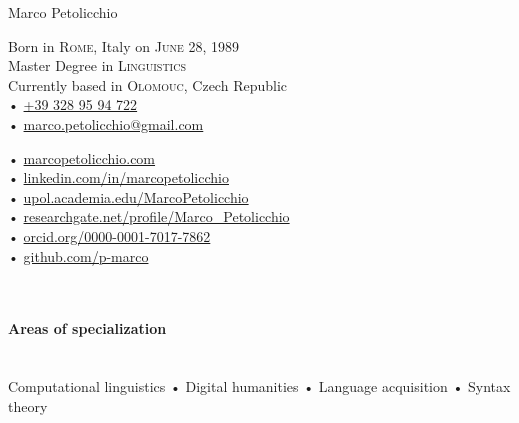 \documentclass[10pt, a4paper]{article}
\begin{document}
\reversemarginpar
{{\huge Marco Petolicchio}\\[1.2cm]
\parbox{.5\linewidth}{

Born in \textsc{Rome}, Italy on \textsc{June 28, 1989} \\
Master Degree in \textsc{Linguistics}\\
Currently based in \textsc{Olomouc}, Czech Republic \\[.4cm]
• \href{tel:+393289594722}{+39 328 95 94 722}\\
• \href{mailto:marco.petolicchio@gmail.com}{marco.petolicchio@gmail.com}
}
\parbox{.5\linewidth}{
• \href{http://marcopetolicchio.com}{marcopetolicchio.com}\\
• \href{http://www.linkedin.com/in/marcopetolicchio/}{linkedin.com/in/marcopetolicchio}\\
• \href{http://upol.academia.edu/MarcoPetolicchio}{upol.academia.edu/MarcoPetolicchio}\\
• \href{https://www.researchgate.net/profile/Marco_Petolicchio}{researchgate.net/profile/Marco\_Petolicchio}\\
• \href{http://orcid.org/0000-0001-7017-7862}{orcid.org/0000-0001-7017-7862}\\
• \href{http://github.com/p-marco/}{github.com/p-marco}\\
}\\[.4cm]



\paragraph{Areas of specialization} \hfill \\%
Computational linguistics • Digital humanities • Language acquisition • Syntax theory 



}
\end{document}
